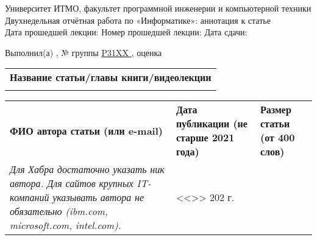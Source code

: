 \documentclass[12pt]{article}
\begin{document}
\begin{center}
\quad Университет ИТМО, факультет программной инженерии и компьютерной техники \\
\quad Двухнедельная отчётная работа по «Информатике»: аннотация к статье\\
\quad Дата прошедшей лекции: \underline{\hspace{2.3cm}} 	Номер прошедшей лекции: \underline{\hspace{0.8cm}}	Дата сдачи: \underline{\hspace{2.3cm}}

\bigskip

\quad Выполнил(а) \underline{\hspace{5cm}}, № группы \underline{ P31XX }, оценка \underline{\hspace{2cm}}


\end{center}

\begin{tabularx}{\textwidth} { 
  | >{\raggedright\arraybackslash}X|}
    \hline
\textbf{Название статьи/главы книги/видеолекции}\\
    \\
    \hline
\end{tabularx}

\begin{tabularx}{\textwidth} 
{ 
| >{\centering\arraybackslash}X
| >{\centering\arraybackslash}X
| >{\centering\arraybackslash}X 
|}
    \textbf{ФИО автора статьи \quad (или e-mail)} & \textbf{Дата публикации \qquad\qquad (не старше 2021 года)} & \textbf{Размер статьи \qquad\qquad (от 400 слов)} \\
     \textit{Для Хабра достаточно указать ник автора. Для сайтов крупных IT-компаний указывать автора не обязательно (ibm.com, microsoft.com, intel.com).} & <<\underline{\hspace{0.5cm}}>> \underline{\hspace{1.5cm}} 202\underline{\hspace{0.2cm}} г. & \underline{\hspace{2.5cm}} \\
    \hline
\end{tabularx}
\end{document}
